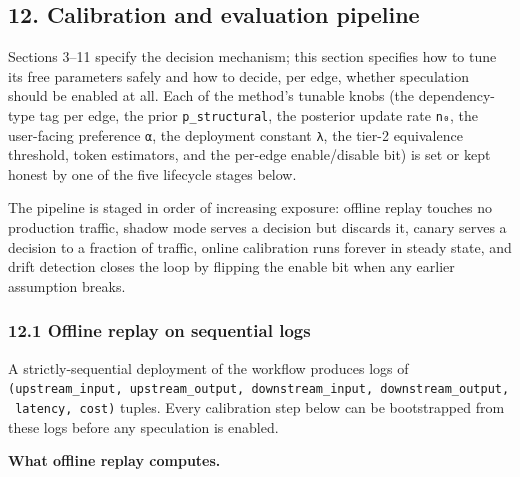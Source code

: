 \documentclass[
  11pt,
]{article}
\begin{document}
\subsection{12. Calibration and evaluation
pipeline}\label{calibration-and-evaluation-pipeline}

Sections 3--11 specify the decision mechanism; this section specifies
how to tune its free parameters safely and how to decide, per edge,
whether speculation should be enabled at all. Each of the method's
tunable knobs (the dependency-type tag per edge, the prior
\texttt{p\_structural}, the posterior update rate \texttt{n₀}, the
user-facing preference \texttt{α}, the deployment constant \texttt{λ},
the tier-2 equivalence threshold, token estimators, and the per-edge
enable/disable bit) is set or kept honest by one of the five lifecycle
stages below.

The pipeline is staged in order of increasing exposure: offline replay
touches no production traffic, shadow mode serves a decision but
discards it, canary serves a decision to a fraction of traffic, online
calibration runs forever in steady state, and drift detection closes the
loop by flipping the enable bit when any earlier assumption breaks.

\subsubsection{12.1 Offline replay on sequential
logs}\label{offline-replay-on-sequential-logs}

A strictly-sequential deployment of the workflow produces logs of
\texttt{(upstream\_input,\ upstream\_output,\ downstream\_input,\ downstream\_output,\ latency,\ cost)}
tuples. Every calibration step below can be bootstrapped from these logs
before any speculation is enabled.

\textbf{What offline replay computes.}
\end{document}
